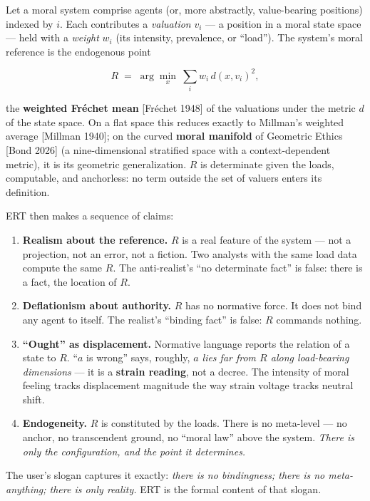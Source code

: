 \documentclass[
]{article}
\providecommand{\tightlist}{%
  \setlength{\itemsep}{0pt}\setlength{\parskip}{0pt}}
\begin{document}
Let a moral system comprise agents (or, more abstractly, value-bearing
positions) indexed by \(i\). Each contributes a \emph{valuation} \(v_i\)
--- a position in a moral state space --- held with a \emph{weight}
\(w_i\) (its intensity, prevalence, or ``load''). The system's moral
reference is the endogenous point

\[ R \;=\; \arg\min_{x}\ \sum_i w_i\, d(x, v_i)^2, \]

the \textbf{weighted Fréchet mean} {[}Fréchet 1948{]} of the valuations
under the metric \(d\) of the state space. On a flat space this reduces
exactly to Millman's weighted average {[}Millman 1940{]}; on the curved
\textbf{moral manifold} of Geometric Ethics {[}Bond 2026{]} (a
nine-dimensional stratified space with a context-dependent metric), it
is its geometric generalization. \(R\) is determinate given the loads,
computable, and anchorless: no term outside the set of valuers enters
its definition.

ERT then makes a sequence of claims:

\begin{enumerate}
\def\labelenumi{\arabic{enumi}.}
\tightlist
\item
  \textbf{Realism about the reference.} \(R\) is a real feature of the
  system --- not a projection, not an error, not a fiction. Two analysts
  with the same load data compute the same \(R\). The anti-realist's
  ``no determinate fact'' is false: there is a fact, the location of
  \(R\).
\item
  \textbf{Deflationism about authority.} \(R\) has no normative force.
  It does not bind any agent to itself. The realist's ``binding fact''
  is false: \(R\) commands nothing.
\item
  \textbf{``Ought'' as displacement.} Normative language reports the
  relation of a state to \(R\). ``\(a\) is wrong'' says, roughly,
  \emph{\(a\) lies far from \(R\) along load-bearing dimensions} --- it
  is a \textbf{strain reading}, not a decree. The intensity of moral
  feeling tracks displacement magnitude the way strain voltage tracks
  neutral shift.
\item
  \textbf{Endogeneity.} \(R\) is constituted by the loads. There is no
  meta-level --- no anchor, no transcendent ground, no ``moral law''
  above the system. \emph{There is only the configuration, and the point
  it determines.}
\end{enumerate}

The user's slogan captures it exactly: \emph{there is no bindingness;
there is no meta-anything; there is only reality.} ERT is the formal
content of that slogan.
\end{document}
